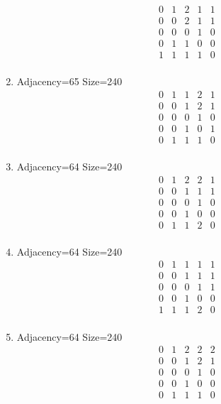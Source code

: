 \documentclass[12pt]{article}
\begin{document}
\begin{multicols}{3}
\begin{enumerate}
\begin{equation*}
\begin{array}{ccccc}
0&1&2&1&1\\
0&0&2&1&1\\
0&0&0&1&0\\
0&1&1&0&0\\
1&1&1&1&0\\
\end{array}
\end{equation*}
\item Adjacency=65 Size=240
\begin{equation*}
\begin{array}{ccccc}
0&1&1&2&1\\
0&0&1&2&1\\
0&0&0&1&0\\
0&0&1&0&1\\
0&1&1&1&0\\
\end{array}
\end{equation*}
\item Adjacency=64 Size=240
\begin{equation*}
\begin{array}{ccccc}
0&1&2&2&1\\
0&0&1&1&1\\
0&0&0&1&0\\
0&0&1&0&0\\
0&1&1&2&0\\
\end{array}
\end{equation*}
\item Adjacency=64 Size=240
\begin{equation*}
\begin{array}{ccccc}
0&1&1&1&1\\
0&0&1&1&1\\
0&0&0&1&1\\
0&0&1&0&0\\
1&1&1&2&0\\
\end{array}
\end{equation*}
\item Adjacency=64 Size=240
\begin{equation*}
\begin{array}{ccccc}
0&1&2&2&2\\
0&0&1&2&1\\
0&0&0&1&0\\
0&0&1&0&0\\
0&1&1&1&0\\
\end{array}

\end{equation*}
\end{enumerate}
\end{multicols}
\end{document}
